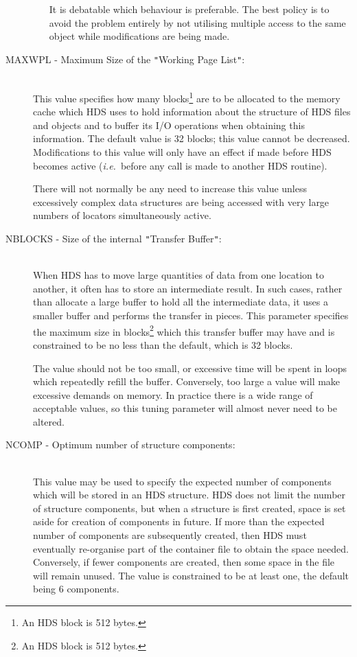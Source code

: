 \documentclass[11pt]{article}
\newcommand{\htmlref}[2]{#1}
\newcommand{\xlabel}[1]{}
\newcommand{\qt}[1]{``#1''}
\newcommand{\st}[1]{{\em{#1}}}
\newcommand{\htmltext}[1]{}
\renewcommand{\qt}[1]{{\tt{"}}#1{\tt{"}}}
\renewcommand{\htmltext}[1]{#1}
\begin{document}
\begin{description}
\begin{itemize}
It is debatable which behaviour is preferable. The best policy is to
avoid the problem entirely by not utilising multiple access to the
same object while modifications are being made.

\end{itemize}

\item [\xlabel{HDS_MAXWPL_tuning_parameter}MAXWPL - Maximum Size of the \qt{Working Page List}:]\mbox{}\\
This value specifies how many blocks\htmltext{\footnote{An HDS block
is 512 bytes.}}  are to be allocated to the memory cache which HDS
uses to hold information about the structure of HDS files and objects
and to buffer its I/O operations when obtaining this information. The
default value is 32 blocks; this value cannot be
decreased. Modifications to this value will only have an effect if
made before HDS becomes active (\st{i.e.}\ before any call is made to
another HDS routine).

There will not normally be any need to increase this value unless
excessively complex data structures are being accessed with very large
numbers of \htmlref{locators}{sect:locators} simultaneously active.

\item [\xlabel{HDS_NBLOCKS_tuning_parameter}NBLOCKS - Size of the internal \qt{Transfer Buffer}:]\mbox{}\\
When HDS has to move large quantities of data from one location to
another, it often has to store an intermediate result. In such cases,
rather than allocate a large buffer to hold all the intermediate data,
it uses a smaller buffer and performs the transfer in pieces. This
parameter specifies the maximum size in blocks\htmltext{\footnote{An
HDS block is 512 bytes.}} which this transfer buffer may have and is
constrained to be no less than the default, which is 32 blocks.

The value should not be too small, or excessive time will be spent in
loops which repeatedly refill the buffer. Conversely, too large a
value will make excessive demands on memory. In practice there is a
wide range of acceptable values, so this tuning parameter will almost
never need to be altered.

\item [\xlabel{HDS_NCOMP_tuning_parameter}NCOMP - Optimum number of structure components:]\mbox{}\\
This value may be used to specify the expected number of components
which will be stored in an HDS structure. HDS does not limit the
number of structure components, but when a structure is first created,
space is set aside for creation of components in future. If more than
the expected number of components are subsequently created, then HDS
must eventually re-organise part of the container file to obtain the
space needed. Conversely, if fewer components are created, then some
space in the file will remain unused. The value is constrained to be
at least one, the default being 6 components.


\end{description}
\end{document}
